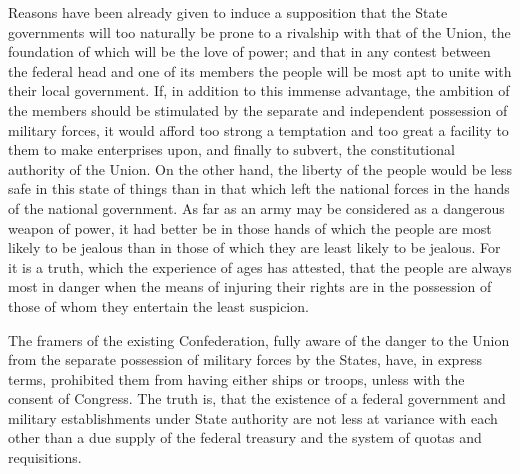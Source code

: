 Reasons have been already given to induce a supposition that the State governments will too naturally be prone to a rivalship with that of the Union, the foundation of which will be the love of power; and that in any contest between the federal head and one of its members the people will be most apt to unite with their local government. 
If, in addition to this immense advantage, the ambition of the members should be stimulated by the separate and independent possession of military forces, it would afford too strong a temptation and too great a facility to them to make enterprises upon, and finally to subvert, the constitutional authority of the Union. 
On the other hand, the liberty of the people would be less safe in this state of things than in that which left the national forces in the hands of the national government. 
As far as an army may be considered as a dangerous weapon of power, it had better be in those hands of which the people are most likely to be jealous than in those of which they are least likely to be jealous. 
For it is a truth, which the experience of ages has attested, that the people are always most in danger when the means of injuring their rights are in the possession of those of whom they entertain the least suspicion.

The framers of the existing Confederation, fully aware of the danger to the Union from the separate possession of military forces by the States, have, in express terms, prohibited them from having either ships or troops, unless with the consent of Congress. 
The truth is, that the existence of a federal government and military establishments under State authority are not less at variance with each other than a due supply of the federal treasury and the system of quotas and requisitions.

